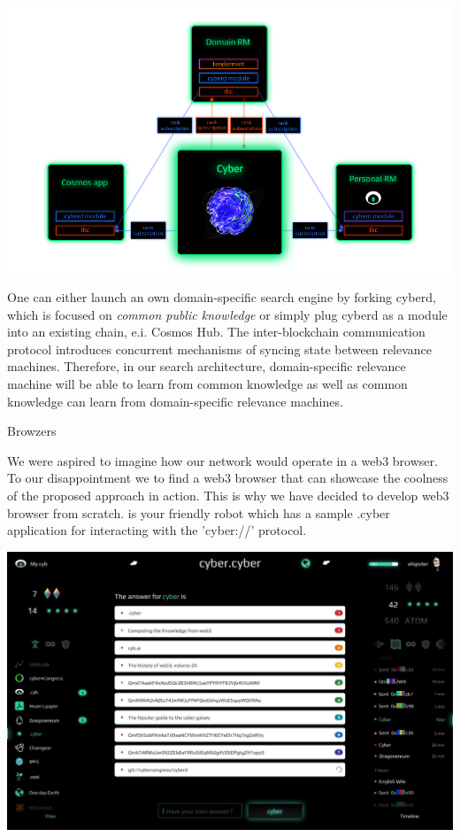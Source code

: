 \documentclass[8pt,oneside]{amsart}
\makeatletter
\newcommand{\linkred}[2]{\href{#1}{\color{red}{#2}}}
\renewcommand\subsection{\@startsection{subsection}
                                    {2}{\z@}
                                    {-3.25ex\@plus -1ex \@minus -.2ex}
                                    {0ex \@plus .2ex}
                                    {\play\Large}
                        }
\newcommand{\titleSection}[1]{\subsection{#1}}
\newenvironment{Figure}
  {\par\medskip\noindent\minipage{\linewidth}}
  {\endminipage\par\medskip}
\makeatother
\begin{document}
\begin{Figure}
    \centering
    \includegraphics[width=1\textwidth]{network.png}
\end{Figure}

One can either launch an own domain-specific search engine by forking cyberd, which is focused on \textit{common public knowledge} or simply plug cyberd as a module into an existing chain, e.i. Cosmos Hub. The inter-blockchain communication protocol introduces concurrent mechanisms of syncing state between relevance machines. Therefore, in our search architecture, domain-specific relevance machine will be able to learn from common knowledge as well as common knowledge can learn from domain-specific relevance machines.

\titleSection{Browzers}\label{browzers}

We were aspired to imagine how our network would operate in a web3 browser. To our disappointment we \linkred{https://github.com/cybercongress/cyb/blob/master/docs/comparison.md}{were not able} to find a web3 browser that can showcase the coolness of the proposed approach in action. This is why we have decided to develop web3 browser from scratch. \linkred{https://github.com/cybercongress/cyb/blob/master/docs/cyb.md}{Cyb} is your friendly robot which has a sample .cyber application for interacting with the 'cyber://' protocol.

\begin{Figure}
  \medskip
  \centering
  \includegraphics[width=1\textwidth]{cyb.jpg}
  \medskip
\end{Figure}
\end{document}
